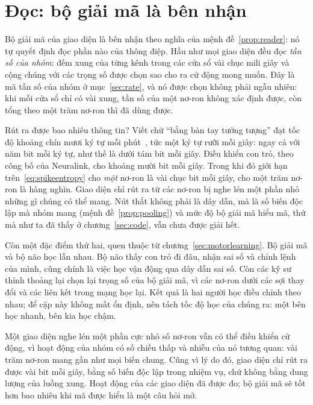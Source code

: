 \section{Đọc: bộ giải mã là bên nhận}

Bộ giải mã của giao diện là bên nhận theo nghĩa của mệnh đề~\ref{prop:reader}: nó tự quyết định đọc phần nào của thông điệp. Hầu như mọi giao diện đều đọc \emph{tần số của nhóm}: đếm xung của từng kênh trong các cửa sổ vài chục mili giây và cộng chúng với các trọng số được chọn sao cho ra cử động mong muốn. Đây là mã tần số của nhóm ở mục~\ref{sec:rate}, và nó được chọn không phải ngẫu nhiên: khi mỗi cửa sổ chỉ có vài xung, tần số của một nơ-ron không xác định được, còn tổng theo một trăm nơ-ron thì đã dùng được.

Rút ra được bao nhiêu thông tin? Viết chữ ``bằng bàn tay tưởng tượng'' đạt tốc độ khoảng chín mươi ký tự mỗi phút~\cite{Willett2021}, tức một ký tự rưỡi mỗi giây: ngay cả với năm bit mỗi ký tự, như thế là dưới tám bit mỗi giây. Điều khiển con trỏ, theo công bố của Neuralink, cho khoảng mười bit mỗi giây. Trong khi đó giới hạn trên~\eqref{eq:spikeentropy} cho \emph{một} nơ-ron là vài chục bit mỗi giây, cho một trăm nơ-ron là hàng nghìn. Giao diện chỉ rút ra từ các nơ-ron bị nghe lén một phần nhỏ những gì chúng có thể mang. Nút thắt không phải là dây dẫn, mà là số biến độc lập mà nhóm mang (mệnh đề~\ref{prop:pooling}) và mức độ bộ giải mã hiểu mã, thứ mà như ta đã thấy ở chương~\ref{sec:code}, vẫn chưa được giải hết.

Còn một đặc điểm thứ hai, quen thuộc từ chương~\ref{sec:motorlearning}. Bộ giải mã và bộ não học lẫn nhau. Bộ não thấy con trỏ đi đâu, nhận sai số và chỉnh lệnh của mình, cũng chính là việc học vận động qua dây dẫn sai số. Còn các kỹ sư thỉnh thoảng lại chọn lại trọng số của bộ giải mã, vì các nơ-ron dưới các sợi thay đổi và các liên kết trong mạng học lại. Kết quả là hai người học điều chỉnh theo nhau; để cặp này không mất ổn định, nên tách tốc độ học của chúng ra: một bên học nhanh, bên kia học chậm.

\begin{keyblock}
\begin{proposition}
\label{prop:probe}
Một giao diện nghe lén một phần cực nhỏ số nơ-ron vẫn có thể điều khiển cử động, vì hoạt động của nhóm có số chiều thấp và nhiễu của nó tương quan: vài trăm nơ-ron mang gần như mọi biến chung. Cũng vì lý do đó, giao diện chỉ rút ra được vài bit mỗi giây, bằng số biến độc lập trong nhiệm vụ, chứ không bằng dung lượng của luồng xung. Hoạt động của các giao diện đã được đo; bộ giải mã sẽ tốt hơn bao nhiêu khi mã được hiểu là một câu hỏi mở.
\end{proposition}
\end{keyblock}

